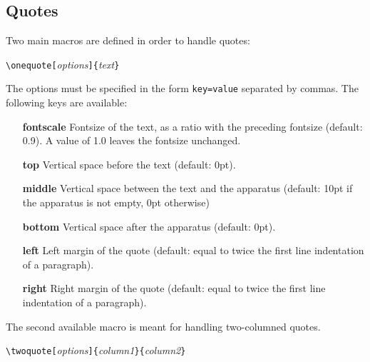 \documentclass[11pt,a4paper]{article}
\begin{document}
	\subsection{Quotes}
	
	Two main macros are defined in order to handle quotes:
	
	\medskip
	
	\verb|\onequote[|\emph{options}\verb|]{|\emph{text}\verb|}|
	
	\medskip
    
	The options must be specified in the form \verb|key=value| separated by commas. The following keys are available:
	\begin{itemize}
		\item[\textbf{fontscale}] Fontsize of the text, as a ratio with the preceding fontsize (default: 0.9). A value of 1.0 leaves the fontsize  unchanged.
		\item[\textbf{top}] Vertical space before the text (default: 0pt).
		\item[\textbf{middle}] Vertical space between the text and the apparatus (default: 10pt if the apparatus is not empty, 0pt otherwise)
		\item[\textbf{bottom}] Vertical space after the apparatus (default: 0pt).
		\item[\textbf{left}] Left margin of the quote (default: equal to twice the first line indentation of a paragraph).
		\item[\textbf{right}] Right margin of the quote (default: equal to twice the first line indentation of a paragraph).
	\end{itemize}
	
	The second available macro is meant for handling two-columned quotes.
	
	\medskip
	
	\verb|\twoquote[|\emph{options}\verb|]{|\emph{column1}\verb|}{|\emph{column2}\verb|}| 
	
	\medskip
	
\end{document}
